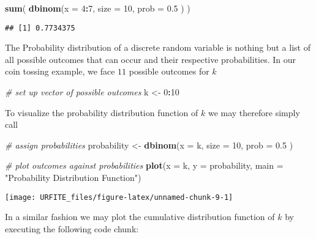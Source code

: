 \documentclass[]{book}
\newenvironment{Shaded}{\begin{snugshade}}{\end{snugshade}}
\newcommand{\KeywordTok}[1]{\textcolor[rgb]{0.13,0.29,0.53}{\textbf{#1}}}
\newcommand{\DataTypeTok}[1]{\textcolor[rgb]{0.13,0.29,0.53}{#1}}
\newcommand{\DecValTok}[1]{\textcolor[rgb]{0.00,0.00,0.81}{#1}}
\newcommand{\FloatTok}[1]{\textcolor[rgb]{0.00,0.00,0.81}{#1}}
\newcommand{\StringTok}[1]{\textcolor[rgb]{0.31,0.60,0.02}{#1}}
\newcommand{\CommentTok}[1]{\textcolor[rgb]{0.56,0.35,0.01}{\textit{#1}}}
\newcommand{\OperatorTok}[1]{\textcolor[rgb]{0.81,0.36,0.00}{\textbf{#1}}}
\newcommand{\NormalTok}[1]{#1}
\theoremstyle{definition}
\theoremstyle{definition}
\theoremstyle{definition}
\theoremstyle{remark}
\begin{document}
\begin{Shaded}
\begin{Highlighting}[]
\KeywordTok{sum}\NormalTok{(}
  \KeywordTok{dbinom}\NormalTok{(}\DataTypeTok{x =} \DecValTok{4}\OperatorTok{:}\DecValTok{7}\NormalTok{, }
         \DataTypeTok{size =} \DecValTok{10}\NormalTok{, }
         \DataTypeTok{prob =} \FloatTok{0.5}
\NormalTok{         )}
\NormalTok{  )}
\end{Highlighting}
\end{Shaded}

\begin{verbatim}
## [1] 0.7734375
\end{verbatim}

The Probability distribution of a discrete random variable is nothing
but a list of all possible outcomes that can occur and their respective
probabilities. In our coin tossing example, we face \(11\) possible
outcomes for \(k\)

\begin{Shaded}
\begin{Highlighting}[]
\CommentTok{# set up vector of possible outcomes}
\NormalTok{k <-}\StringTok{ }\DecValTok{0}\OperatorTok{:}\DecValTok{10}
\end{Highlighting}
\end{Shaded}

To visualize the probability distribution function of \(k\) we may
therefore simply call

\begin{Shaded}
\begin{Highlighting}[]
\CommentTok{# assign probabilities}
\NormalTok{probability <-}\StringTok{ }\KeywordTok{dbinom}\NormalTok{(}\DataTypeTok{x =}\NormalTok{ k,}
                      \DataTypeTok{size =} \DecValTok{10}\NormalTok{, }
                      \DataTypeTok{prob =} \FloatTok{0.5}
\NormalTok{                      )}

\CommentTok{# plot outcomes against probabilities}
\KeywordTok{plot}\NormalTok{(}\DataTypeTok{x =}\NormalTok{ k, }
     \DataTypeTok{y =}\NormalTok{ probability,}
     \DataTypeTok{main =} \StringTok{"Probability Distribution Function"}\NormalTok{) }
\end{Highlighting}
\end{Shaded}

\begin{center}\texttt{[image: URFITE\_files/figure-latex/unnamed-chunk-9-1]} \end{center}

In a similar fashion we may plot the cumulative distribution function of
\(k\) by executing the following code chunk:
\end{document}
